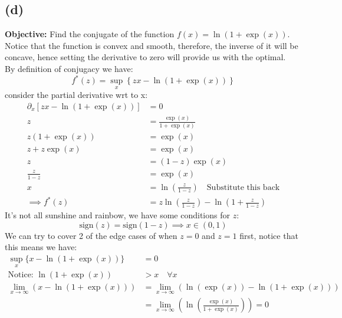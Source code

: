 \documentclass[]{article}
\begin{document}
    \subsection*{(d)}
        \textbf{Objective:} Find the conjugate of the function $f(x)=\ln(1 + \exp(x))$. Notice that the function is convex and smooth, therefore, the inverse of it will be concave, hence setting the derivative to zero will provide us with the optimal. 
        \\
        By definition of conjugacy we have: 
        $$
            f^*(z) = \sup_x \left\lbrace
            zx - \ln(1 + \exp(x))
            \right\rbrace
        $$
        consider the partial derivative wrt to x: 
        \begin{align*}\tag{1d1}\label{eqn:1d1}
           \partial_x [zx - \ln(1 + \exp(x))] &= 0
           \\
           z &= \frac{\exp(x)}{1 + \exp(x)}
           \\
           z(1 + \exp(x)) &= \exp(x)
           \\
           z + z\exp(x) &= \exp(x)
           \\
           z &= (1 - z)\exp(x)
           \\
           \frac{z}{1 - z} &= \exp(x)
           \\
           x &= \ln
           \left(
               \frac{z}{1 - z}
           \right)  \quad \text{Substitute this back}
           \\
           \implies
           f^*(z) &= 
           z\ln \left(
               \frac{z}{1 - z}
           \right)
           - 
           \ln \left(
               1 + \frac{z}{1 - z}
           \right)
        \end{align*}
        It's not all sunshine and rainbow, we have some conditions for $z$: 
        \begin{equation*}\tag{1d2}\label{eqn:1d2}
            \text{sign}(z) = \text{sign}(1 - z) \implies x \in (0, 1)
        \end{equation*}
        We can try to cover 2 of the edge cases of when $z = 0$ and $z = 1$ first, notice that this means we have: 
        \begin{align*}\tag{1d3}\label{eqn:1d3}
            \sup_x\{x - \ln(1 + \exp(x))\} &= 0
            \\
            \text{Notice: } \ln(1 + \exp(x)) &> x \quad \forall x
            \\
            \lim_{x\rightarrow\infty}(x - \ln(1 + \exp(x))) & = \lim_{x\rightarrow\infty}(\ln(\exp(x)) - \ln(1 + \exp(x)))
            \\
            &= \lim_{x\rightarrow \infty} \left(
                \ln 
                    \left(
                        \frac{\exp(x)}{1 + \exp(x)}
                    \right)
            \right) = 0
        \end{align*}
\end{document}
